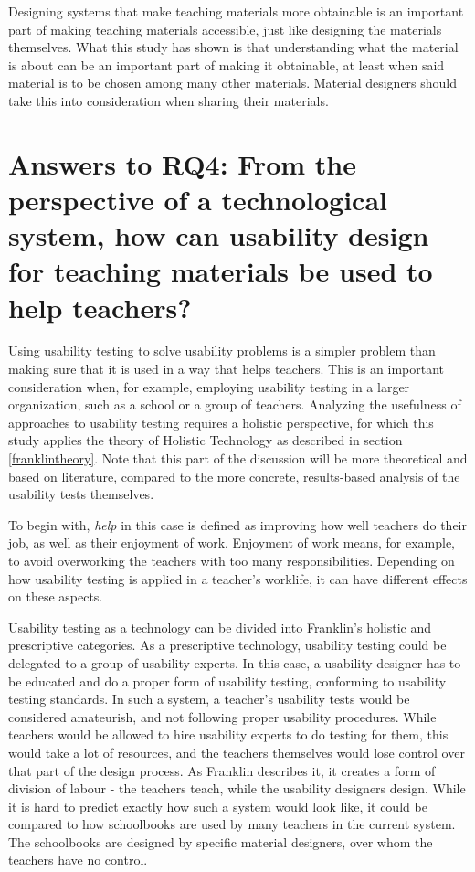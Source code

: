 Designing systems that make teaching materials more obtainable is an important part of making teaching materials accessible, just like designing the materials themselves. What this study has shown is that understanding what the material is about can be an important part of making it obtainable, at least when said material is to be chosen among many other materials. Material designers should take this into consideration when sharing their materials.

\section{Answers to RQ4: From the perspective of a technological system, how can usability design for teaching materials be used to help teachers?}

Using usability testing to solve usability problems is a simpler problem than making sure that it is used in a way that helps teachers. This is an important consideration when, for example, employing usability testing in a larger organization, such as a school or a group of teachers. Analyzing the usefulness of approaches to usability testing requires a holistic perspective, for which this study applies the theory of Holistic Technology as described in section \ref{franklintheory}. Note that this part of the discussion will be more theoretical and based on literature, compared to the more concrete, results-based analysis of the usability tests themselves.

To begin with, \textit{help} in this case is defined as improving how well teachers do their job, as well as their enjoyment of work. Enjoyment of work means, for example, to avoid overworking the teachers with too many responsibilities. Depending on how usability testing is applied in a teacher's worklife, it can have different effects on these aspects.

Usability testing as a technology can be divided into Franklin's holistic and prescriptive categories. As a prescriptive technology, usability testing could be delegated to a group of usability experts. In this case, a usability designer has to be educated and do a proper form of usability testing, conforming to usability testing standards. In such a system, a teacher's usability tests would be considered amateurish, and not following proper usability procedures. While teachers would be allowed to hire usability experts to do testing for them, this would take a lot of resources, and the teachers themselves would lose control over that part of the design process. As Franklin describes it, it creates a form of division of labour - the teachers teach, while the usability designers design. While it is hard to predict exactly how such a system would look like, it could be compared to how schoolbooks are used by many teachers in the current system. The schoolbooks are designed by specific material designers, over whom the teachers have no control.

